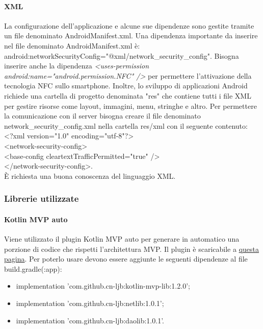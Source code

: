 \paragraph{XML}
La configurazione dell'applicazione e alcune sue dipendenze sono gestite tramite un file denominato AndroidManifest.xml. Una dipendenza importante da inserire nel file denominato AndroidManifest.xml è: android:networkSecurityConfig="@xml/network\_security\_config". Bisogna inserire anche la dipendenza \textit{<uses-permission android:name="android.permission.NFC" />} per permettere l'attivazione della tecnologia NFC sullo smartphone. Inoltre, lo sviluppo di applicazioni Android richiede una cartella di progetto denominata "res" che contiene tutti i file XML per gestire risorse come layout, immagini, menu, stringhe e altro. 
Per permettere la comunicazione con il server bisogna creare il file denominato network\_security\_config.xml nella cartella res/xml con il seguente contenuto:\\ <?xml version="1.0" encoding="utf-8"?>\\
<network-security-config>\\
<base-config cleartextTrafficPermitted="true" />\\
</network-security-config>.\\
È richiesta una buona conoscenza del linguaggio XML.

\subsubsection{Librerie utilizzate}

\paragraph{Kotlin MVP auto}
Viene utilizzato il plugin Kotlin MVP auto per generare in automatico una porzione di codice che rispetti l'architettura MVP. Il plugin è scaricabile a \href{https://plugins.jetbrains.com/plugin/12265-kotlin-mvp-auto}{questa pagina}.
Per poterlo usare devono essere aggiunte le seguenti dipendenze al file build.gradle(:app):\\
\begin{itemize}
	\item implementation 'com.github.cn-ljb:kotlin-mvp-lib:1.2.0'; \\
	\item implementation 'com.github.cn-ljb:netlib:1.0.1'; \\
	\item implementation 'com.github.cn-ljb:daolib:1.0.1'. \\
\end{itemize}

